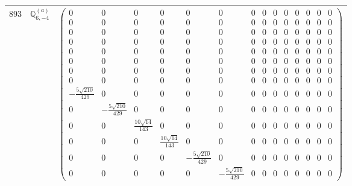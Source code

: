 \documentclass[fleqn,8pt,landscape]{jsarticle}
\begin{document}
\begin{center}
\begin{longtable}{ccc}
$ 893 $ & $ \mathbb{Q}_{6,-4}^{(a)} $ & $ \begin{pmatrix} 0 & 0 & 0 & 0 & 0 & 0 & 0 & 0 & 0 & 0 & 0 & 0 & 0 & 0 \\ 0 & 0 & 0 & 0 & 0 & 0 & 0 & 0 & 0 & 0 & 0 & 0 & 0 & 0 \\ 0 & 0 & 0 & 0 & 0 & 0 & 0 & 0 & 0 & 0 & 0 & 0 & 0 & 0 \\ 0 & 0 & 0 & 0 & 0 & 0 & 0 & 0 & 0 & 0 & 0 & 0 & 0 & 0 \\ 0 & 0 & 0 & 0 & 0 & 0 & 0 & 0 & 0 & 0 & 0 & 0 & 0 & 0 \\ 0 & 0 & 0 & 0 & 0 & 0 & 0 & 0 & 0 & 0 & 0 & 0 & 0 & 0 \\ 0 & 0 & 0 & 0 & 0 & 0 & 0 & 0 & 0 & 0 & 0 & 0 & 0 & 0 \\ 0 & 0 & 0 & 0 & 0 & 0 & 0 & 0 & 0 & 0 & 0 & 0 & 0 & 0 \\ - \frac{5 \sqrt{210}}{429} & 0 & 0 & 0 & 0 & 0 & 0 & 0 & 0 & 0 & 0 & 0 & 0 & 0 \\ 0 & - \frac{5 \sqrt{210}}{429} & 0 & 0 & 0 & 0 & 0 & 0 & 0 & 0 & 0 & 0 & 0 & 0 \\ 0 & 0 & \frac{10 \sqrt{14}}{143} & 0 & 0 & 0 & 0 & 0 & 0 & 0 & 0 & 0 & 0 & 0 \\ 0 & 0 & 0 & \frac{10 \sqrt{14}}{143} & 0 & 0 & 0 & 0 & 0 & 0 & 0 & 0 & 0 & 0 \\ 0 & 0 & 0 & 0 & - \frac{5 \sqrt{210}}{429} & 0 & 0 & 0 & 0 & 0 & 0 & 0 & 0 & 0 \\ 0 & 0 & 0 & 0 & 0 & - \frac{5 \sqrt{210}}{429} & 0 & 0 & 0 & 0 & 0 & 0 & 0 & 0 \end{pmatrix} $ \\ \hline

\end{longtable}
\end{center}
\end{document}
